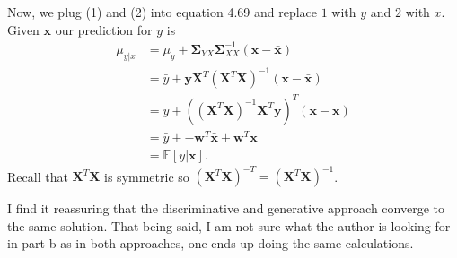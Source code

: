 \documentclass[a4paper,11pt]{article}
\begin{document}
Now, we plug (1) and (2) into equation 4.69 and replace $1$ with
$y$ and $2$ with $x$.  Given $\mathbf{x}$ our prediction for $y$ is
\begin{align*}
    \mu_{y|x} & = \mu_y + \mathbf{\Sigma}_{YX} \mathbf{\Sigma}_{XX}^{-1}
    (\mathbf{x} - \bar{\mathbf{x}}) \\
    & = \bar{y} + \mathbf{y}\mathbf{X}^T(\mathbf{X}^T\mathbf{X})^{-1}
    (\mathbf{x} - \bar{\mathbf{x}}) \\
    & = \bar{y} + ((\mathbf{X}^T\mathbf{X})^{-1}\mathbf{X}^T\mathbf{y})^T
    (\mathbf{x} - \bar{\mathbf{x}}) \\
    & = \bar{y} +  - \mathbf{w}^T\bar{\mathbf{x}} + \mathbf{w}^T\mathbf{x} \\
    & = \mathbb{E}[y|\mathbf{x}].
\end{align*}
Recall that $\mathbf{X}^T\mathbf{X}$ is symmetric so $(\mathbf{X}^T\mathbf{X})^{-T} = 
(\mathbf{X}^T\mathbf{X})^{-1}$.

I find it reassuring that the discriminative and generative approach converge to the same solution.
That being said, I am not sure what the author is looking for in part b
as in both approaches, one ends up doing the same calculations.
\end{document}
